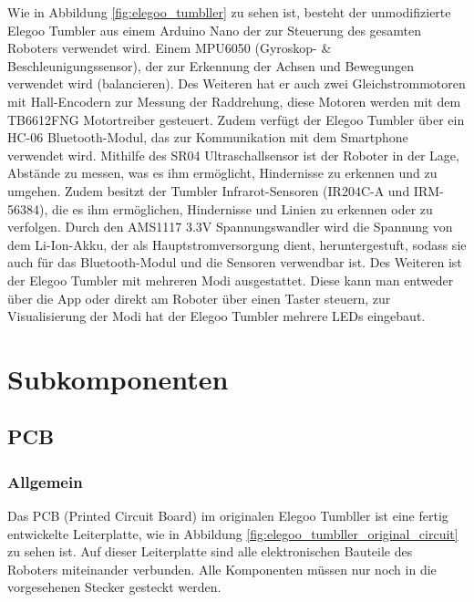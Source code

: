Wie in Abbildung \ref{fig:elegoo_tumbller} zu sehen ist,
besteht der unmodifizierte Elegoo Tumbler aus einem Arduino Nano der zur Steuerung des gesamten Roboters verwendet wird.
%
Einem MPU6050 (Gyroskop- \& Beschleunigungssensor),
der zur Erkennung der Achsen und Bewegungen verwendet wird (balancieren).
%
Des Weiteren hat er auch zwei Gleichstrommotoren mit Hall-Encodern zur Messung der Raddrehung,
diese Motoren werden mit dem TB6612FNG Motortreiber gesteuert.
%
Zudem verfügt der Elegoo Tumbler über ein HC-06 Bluetooth-Modul,
das zur Kommunikation mit dem Smartphone verwendet wird.
%
Mithilfe des SR04 Ultraschallsensor ist der Roboter in der Lage,
Abstände zu messen, was es ihm ermöglicht, Hindernisse zu erkennen und zu umgehen.
%
Zudem besitzt der Tumbler Infrarot-Sensoren (IR204C-A und IRM-56384), die es ihm ermöglichen,
Hindernisse und Linien zu erkennen oder zu verfolgen.
%
Durch den AMS1117 3.3V Spannungswandler wird die Spannung von dem Li-Ion-Akku,
der als Hauptstromversorgung dient, heruntergestuft,
sodass sie auch für das Bluetooth-Modul und die Sensoren verwendbar ist.
%
Des Weiteren ist der Elegoo Tumbler mit mehreren Modi ausgestattet.
%
Diese kann man entweder über die App oder direkt am Roboter über einen Taster steuern,
zur Visualisierung der Modi hat der Elegoo Tumbler mehrere LEDs eingebaut.
\section{Subkomponenten}
\label{subsec:subkomponenten}
%
\subsection{PCB}
%
\subsubsection{Allgemein}
Das PCB (Printed Circuit Board) im originalen Elegoo Tumbller ist eine fertig entwickelte Leiterplatte,
wie in Abbildung \ref{fig:elegoo_tumbller_original_circuit} zu sehen ist.
%
Auf dieser Leiterplatte sind alle elektronischen Bauteile des Roboters miteinander verbunden.
%
Alle Komponenten müssen nur noch in die vorgesehenen Stecker gesteckt werden.
%
